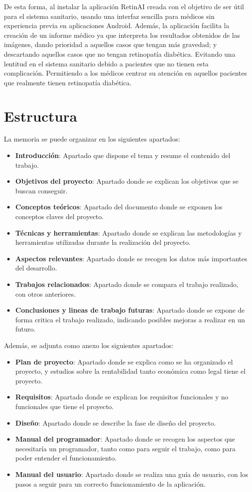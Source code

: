 De esta forma, al instalar la aplicación RetinAI creada con el objetivo de ser útil para el sistema sanitario, usando una interfaz sencilla para médicos sin experiencia previa en aplicaciones Android. Además, la aplicación facilita la creación de un informe médico ya que interpreta los resultados obtenidos de las imágenes, dando prioridad a aquellos casos que tengan más gravedad; y descartando aquellos casos que no tengan retinopatía diabética. Evitando una lentitud en el sistema sanitario debido a pacientes que no tienen esta complicación. 
Permitiendo a los médicos centrar su atención en aquellos pacientes que realmente tienen retinopatía diabética.

\section{Estructura}
La memoria se puede organizar en los siguientes apartados:
\begin{itemize}
    \item \textbf{Introducción}: Apartado que dispone el tema y resume el contenido del trabajo.
    \item \textbf{Objetivos del proyecto}: Apartado donde se explican los objetivos que se buscan conseguir.
    \item \textbf{Conceptos teóricos}: Apartado del documento donde se exponen los conceptos claves del proyecto.
    \item \textbf{Técnicas y herramientas}: Apartado donde se explican las metodologías y herramientas utilizadas durante la realización del proyecto.
    \item \textbf{Aspectos relevantes}: Apartado donde se recogen los datos más importantes del desarrollo.
    \item \textbf{Trabajos relacionados}: Apartado donde se compara el trabajo realizado, con otros anteriores.
    \item \textbf{Conclusiones y lineas de trabajo futuras}: Apartado donde se expone de forma critica el trabajo realizado, indicando posibles mejoras a realizar en un futuro.
\end{itemize}

Además, se adjunta como anexo los siguientes apartados:
\begin{itemize}
    \item \textbf{Plan de proyecto}: Apartado donde se explica como se ha organizado el proyecto, y estudios sobre la rentabilidad tanto económica como legal tiene el proyecto.
    \item \textbf{Requisitos}: Apartado donde se explican los requisitos funcionales y no funcionales que tiene el proyecto.
    \item \textbf{Diseño}: Apartado donde se describe la fase de diseño del proyecto.
    \item \textbf{Manual del programador}: Apartado donde se recogen los aspectos que necesitaría un programador, tanto como para seguir el trabajo, como para poder entender el funcionamiento.
    \item \textbf{Manual del usuario}: Apartado donde se realiza una guía de usuario, con los pasos a seguir para un correcto funcionamiento de la aplicación.
\end{itemize}